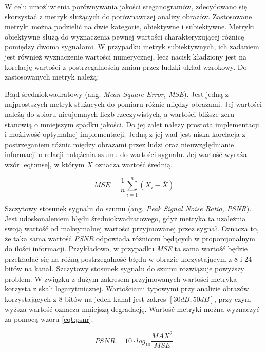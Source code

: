 {    %
    W celu umożliwienia porównywania jakości steganogramów, zdecydowano się skorzystać z metryk służących
    do porównawczej analizy obrazów. Zastosowane metryki można podzielić na dwie kategorie, obiektywne i subiektywne.
    Metryki obiektywne służą do wyznaczenia pewnej wartości charakteryzującej różnicę pomiędzy dwoma sygnałami. W
    przypadku metryk subiektywnych, ich zadaniem jest również wyznaczenie wartości numerycznej, lecz nacisk kładziony
    jest na korelację wartości z postrzegalnością zmian przez ludzki układ wzrokowy. Do zastosowanych metryk należą:

    Błąd średniokwadratowy (ang. \textit{Mean Square Error, MSE}). Jest jedną z najprostszych metryk służących do
    pomiaru różnic między obrazami. Jej wartości należą do zbioru nieujemnych liczb rzeczywistych, a wartości bliższe
    zeru stanowią o mniejszym spadku jakości. Do jej zalet należy prostota implementacji i możliwość optymalnej
    implementacji. Jedną z jej wad jest niska korelacja z postrzeganiem różnic między obrazami przez ludzi oraz
    nieuwzględnianie informacji o relacji natężenia szumu do wartości sygnału. Jej wartość wyraża wzór \ref{eqt:mse}, w
    którym $\overline{X}$ oznacza wartość średnią.

    \begin{equation}\label{eqt:mse}
        MSE = \frac{1}{n} \sum_{i=1}^n (X_i - \overline{X})
    \end{equation}

    Szczytowy stosunek sygnału do szumu (ang. \textit{Peak Signal Noise Ratio, PSNR}). Jest udoskonaleniem błędu
    średniokwadratowego, gdyż metryka ta uzależnia swoją wartość od maksymalnej wartości przyjmowanej przez sygnał.
    Oznacza to, że taka sama wartość \textit{PSNR} odpowiada różnicom będących w proporcjonalnym do ilości informacji.
    Przykładowo, w przypadku \textit{MSE} ta sama wartość będzie przekładać się na różną postrzegalność błędu w obrazie
    korzystającym z 8 i 24 bitów na kanał. Szczytowy stosunek sygnału do szumu rozwiązuje powyższy problem. W związku z
    dużym zakresem przyjmowanych wartości metryka korzysta z skali logarytmicznej. Wartościami typowymi przy analizie
    obrazów korzystających z 8 bitów na jeden kanał jest zakres $[30dB, 50dB]$, przy czym wyższa wartość oznacza
    mniejszą degradację. Wartość metryki można wyznaczyć za pomocą wzoru \ref{eqt:psnr}.

    \begin{equation}\label{eqt:psnr}
        PSNR = 10 \cdot log_{10} \frac{MAX^2}{MSE}
    \end{equation}

}
